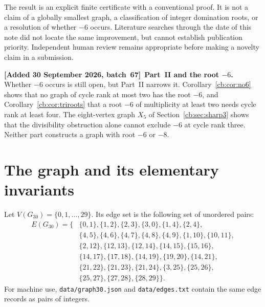 \documentclass[11pt]{article}
\numberwithin{equation}{section}
\theoremstyle{definition}
\newenvironment{writenote}[1][]{\par\smallskip\begingroup\small\sloppy
 \noindent\textbf{[Added 30 September 2026, batch~67]}\if\relax\detokenize{#1}\relax\else~\textbf{#1.}\fi\ }%
 {\par\endgroup\smallskip}
\newcommand{\Gthirty}{G_{30}}
\begin{document}
The result is an explicit finite certificate with a conventional proof.
It is not a claim of a globally smallest graph, a classification of
integer domination roots, or a resolution of whether \(-6\) occurs.
Literature searches through the date of this note did not locate the
same improvement, but cannot establish publication priority. Independent
human review remains appropriate before making a novelty claim in a
submission.

\begin{writenote}[Part~II and the root \(-6\)]
Whether \(-6\) occurs is still open, but Part~II narrows it.
Corollary~\ref{cb:cor:no6} shows that no graph of cycle rank at most two
has the root \(-6\), and Corollary~\ref{cb:cor:triroots} that a root
\(-6\) of multiplicity at least two needs cycle rank at least four. The
eight-vertex graph \(X_5\) of Section~\ref{cb:sec:sharp3} shows that the
divisibility obstruction alone cannot exclude \(-6\) at cycle rank three.
Neither part constructs a graph with root \(-6\) or \(-8\).
\end{writenote}

\section{The graph and its elementary invariants}\label{sec:graph}

Let \(V(\Gthirty)=\{0,1,\ldots,29\}\). Its edge set is the following
set of unordered pairs:
\begin{equation}\label{eq:edges}
\begin{aligned}
E(\Gthirty)=\{&
\{0,1\},\{1,2\},\{2,3\},\{3,0\},\{1,4\},\{2,4\},\\
&\{4,5\},\{4,6\},\{4,7\},\{4,8\},\{4,9\},\{1,10\},\{10,11\},\\
&\{2,12\},\{12,13\},\{12,14\},\{14,15\},\{15,16\},\\
&\{14,17\},\{17,18\},\{14,19\},\{19,20\},\{14,21\},\\
&\{21,22\},\{21,23\},\{21,24\},\{3,25\},\{25,26\},\\
&\{25,27\},\{27,28\},\{28,29\}\}.
\end{aligned}
\end{equation}
For machine use, \texttt{data/graph30.json} and \texttt{data/edges.txt}
contain the same edge records as pairs of integers.
\end{document}
